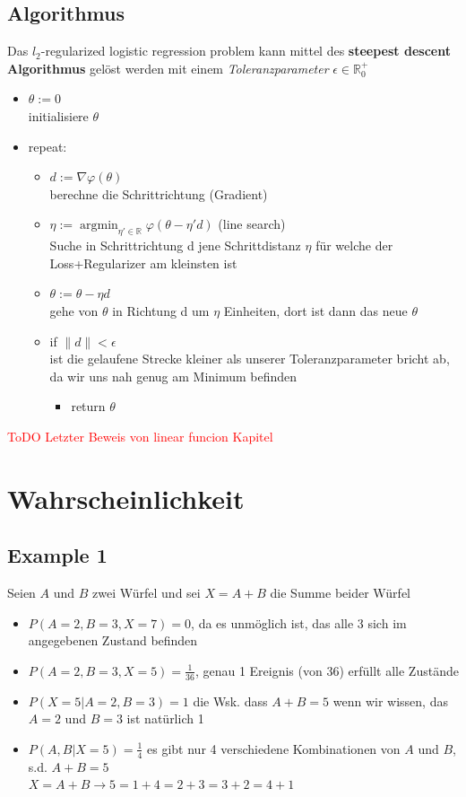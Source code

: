 \documentclass[12pt,a4paper]{article}
\DeclareMathOperator*{\argmin}{argmin}
\newcommand{\red}[1]{\textcolor{red} {#1}}
\begin{document}
\subsection{Algorithmus}
Das $l_2$-regularized logistic regression problem kann mittel des \textbf{steepest descent Algorithmus} gelöst werden mit einem \textit{Toleranzparameter} $\epsilon \in \mathbb{R}^+_0$
\begin{itemize}
\item $\theta := 0$\\
initialisiere $\theta$
\item repeat:
\begin{itemize}
\item $d := \nabla \varphi(\theta)$\\
berechne die Schrittrichtung (Gradient)
\item $\displaystyle \eta := \argmin_{\eta'\in\mathbb{R}} \varphi(\theta - \eta'd)$ (line search)\\
Suche in Schrittrichtung d jene Schrittdistanz $\eta$ für welche der Loss+Regularizer am kleinsten ist
\item $\theta := \theta - \eta d$\\
gehe von $\theta$ in Richtung d um $\eta$ Einheiten, dort ist dann das neue $\theta$
\item if $\|d\| < \epsilon$\\
ist die gelaufene Strecke kleiner als unserer Toleranzparameter bricht ab, da wir uns nah genug am Minimum befinden
\begin{itemize}
\item return $\theta$
\end{itemize}
\end{itemize}
\end{itemize}

\red{ToDO Letzter Beweis von linear funcion Kapitel}


\section{Wahrscheinlichkeit}
\subsection{Example 1}
Seien $A$ und $B$ zwei Würfel und sei $X=A+B$ die Summe beider Würfel
\begin{itemize}
\item $P(A=2,B=3,X=7) = 0$, da es unmöglich ist, das alle 3 sich im angegebenen Zustand befinden
\item $P(A=2,B=3,X=5) = \frac{1}{36}$, genau 1 Ereignis (von 36) erfüllt alle Zustände
\item $P(X=5|A=2, B=3) = 1$ die Wsk. dass $A+B =5$ wenn wir wissen, das $A=2$ und $B=3$ ist natürlich 1
\item $P(A,B|X=5) = \frac{1}{4}$ es gibt nur 4 verschiedene Kombinationen von $A$ und $B$, s.d. $A+B=5$\\
$X=A+B \rightarrow 5=1+4=2+3=3+2=4+1$
\end{itemize}
\end{document}

